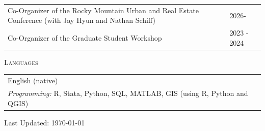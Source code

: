\documentclass[11pt]{amsart}
\begin{document}
\normalsize
\begin{tabular}{ p{12.5cm} p{5cm}}

Co-Organizer of the Rocky Mountain Urban and Real Estate Conference (with Jay Hyun and Nathan Schiff)  & 2026- \\


Co-Organizer of the Graduate Student Workshop  & 2023 - 2024  \\
\end{tabular}

\vspace{0.4cm}
\LARGE
\textsc{Languages}
\vspace{0.2cm}

\normalsize
\begin{tabular}{ p{17.5cm}}
  English (native)  \\
  \emph{Programming:} R, Stata, Python, SQL, MATLAB, GIS (using R, Python and QGIS)
\end{tabular}





\vspace{0.5cm}
\begin{center}
\tiny Last Updated: \today
\end{center}
\end{document}
